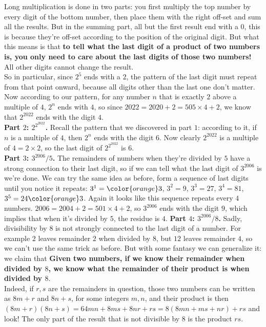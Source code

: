 \documentclass[11pt]{scrartcl}
\begin{document}
\begin{enumerate}[label=\textbf{N\arabic*}.]
    Long multiplication is done in two parts: you first multiply the top number by every digit of the bottom number, then place them with the right off-set and sum all the results. But in the summing part, all but the first result end with a $0$, this is because they're off-set according to the position of the original digit. But what this means is that \textbf{to tell what the last digit of a product of two numbers is, you only need to care about the last digits of those two numbers!} All other digits cannot change the result.\\
    So in particular, since $2^5$ ends with a $2$, the pattern of the last digit must repeat from that point onward, because all digits other than the last one don't matter. Now according to our pattern, for any number $n$ that is exactly $2$ above a multiple of $4$, $2^n$ ends with $4$, so since $2022 = 2020 + 2 = 505\times4+2$, we know that $2^{2022}$ ends with the digit $\boxed{4}$.\\
    \textbf{Part $2$: $2^{2^{2022}}$.} Recall the pattern that we discovered in part $1$: according to it, if $n$ is a multiple of $4$, then $2^n$ ends with the digit $6$. Now clearly $2^{2022}$ is a multiple of $4 = 2\times 2$, so the last digit of $2^{2^{2022}}$ is $\boxed{6}$.\\
    \textbf{Part $3$: $3^{2006}/5$.} The remainders of numbers when they're divided by $5$ have a strong connection to their last digit, so if we can tell what the last digit of $3^{2006}$ is we're done. We can try the same idea as before, form a sequence of last digits until you notice it repeats: $3^1 = \color{orange}3$, $3^2 = 9$, $3^3 = 27$, $3^4 = 81$, $3^5 = 24\color{orange}3$. Again it looks like this sequence repeats every $4$ numbers. $2006 = 2004 + 2 = 501\times 4 + 2$, so $3^{2006}$ ends with the digit $9$, which implies that when it's divided by $5$, the residue is $\boxed{4}$.
    \textbf{Part $4$: $3^{2006}/8$.} Sadly, divisibility by $8$ is not strongly connected to the last digit of a number. For example $2$ leaves remainder $2$ when divided by $8$, but $12$ leaves remainder $4$, so we can't use the same trick as before. But with some fantasy we can generalize it: we claim that \textbf{Given two numbers, if we know their remainder when divided by $8$, we know what the remainder of their product is when divided by $8$}.\\Indeed, if $r,s$ are the remainders in question, those two numbers can be written as $8m+r$ and $8n+s$, for some integers $m,n$, and their product is then $(8m+r)(8n+s) = 64mn + 8ms + 8nr + rs = 8(8mn+ms+nr) + rs$ and look! The only part of the result that is not divisible by $8$ is the product $rs$.\\

\end{enumerate}
\end{document}
